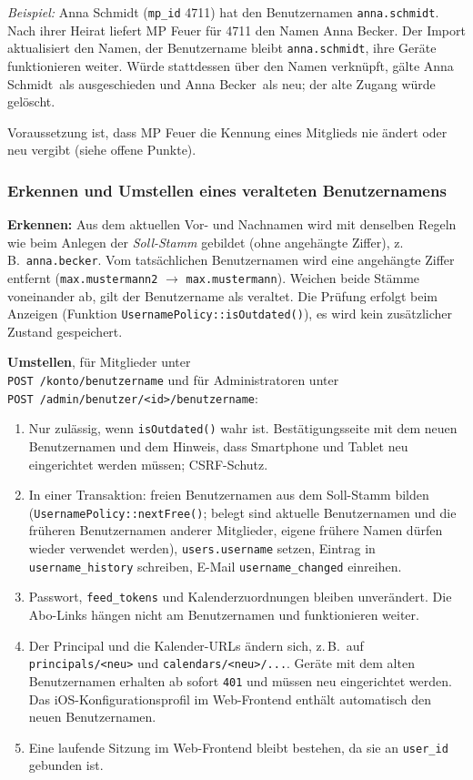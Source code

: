\documentclass[a4paper,fontsize=10pt]{scrartcl}
\newcommand{\code}[1]{\texttt{#1}}
\begin{document}
\emph{Beispiel:} Anna Schmidt (\code{mp\_id} 4711) hat den Benutzernamen
\code{anna.schmidt}. Nach ihrer Heirat liefert MP Feuer für 4711 den Namen
Anna Becker. Der Import aktualisiert den Namen, der Benutzername bleibt
\code{anna.schmidt}, ihre Geräte funktionieren weiter. Würde stattdessen über
den Namen verknüpft, gälte \glqq Anna Schmidt\grqq\ als ausgeschieden und
\glqq Anna Becker\grqq\ als neu; der alte Zugang würde gelöscht.

Voraussetzung ist, dass MP Feuer die Kennung eines Mitglieds nie ändert oder
neu vergibt (siehe offene Punkte).

\subsubsection*{Erkennen und Umstellen eines veralteten Benutzernamens}

\textbf{Erkennen:} Aus dem aktuellen Vor- und Nachnamen wird mit denselben
Regeln wie beim Anlegen der \emph{Soll-Stamm} gebildet (ohne angehängte
Ziffer), z.\,B.\ \code{anna.becker}. Vom tatsächlichen Benutzernamen wird eine
angehängte Ziffer entfernt (\code{max.mustermann2} $\rightarrow$
\code{max.mustermann}). Weichen beide Stämme voneinander ab, gilt der
Benutzername als veraltet. Die Prüfung erfolgt beim Anzeigen
(Funktion \code{UsernamePolicy::isOutdated()}), es wird kein zusätzlicher
Zustand gespeichert.

\textbf{Umstellen}, für Mitglieder unter\\
\code{POST /konto/benutzername} und für Administratoren unter\\
\code{POST /admin/benutzer/<id>/benutzername}:

\begin{enumerate}
  \item Nur zulässig, wenn \code{isOutdated()} wahr ist. Bestätigungsseite
        mit dem neuen Benutzernamen und dem Hinweis, dass Smartphone und
        Tablet neu eingerichtet werden müssen; CSRF-Schutz.
  \item In einer Transaktion: freien Benutzernamen aus dem Soll-Stamm
        bilden (\code{UsernamePolicy::nextFree()}; belegt sind aktuelle
        Benutzernamen und die früheren Benutzernamen anderer Mitglieder,
        eigene frühere Namen dürfen wieder verwendet werden),
        \code{users.username} setzen,
        Eintrag in \code{username\_history} schreiben, E-Mail
        \code{username\_changed} einreihen.
  \item Passwort, \code{feed\_tokens} und Kalenderzuordnungen bleiben
        unverändert. Die Abo-Links hängen nicht am Benutzernamen und
        funktionieren weiter.
  \item Der Principal und die Kalender-URLs ändern sich, z.\,B.\ auf
        \code{principals/<neu>} und \code{calendars/<neu>/...}. Geräte mit dem
        alten Benutzernamen erhalten ab sofort \code{401} und müssen neu
        eingerichtet werden. Das iOS-Konfigurationsprofil im Web-Frontend
        enthält automatisch den neuen Benutzernamen.
  \item Eine laufende Sitzung im Web-Frontend bleibt bestehen, da sie an
        \code{user\_id} gebunden ist.
\end{enumerate}
\end{document}
